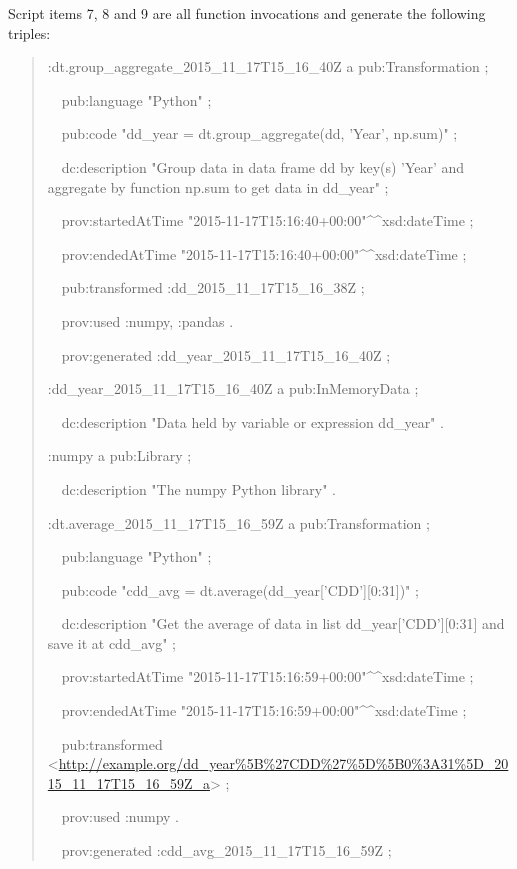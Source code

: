 Script items 7, 8 and 9 are all function invocations and generate the following triples:
\begin{quotation}
	\noindent:dt.group\_aggregate\_2015\_11\_17T15\_16\_40Z a pub:Transformation ;
	
	\noindent\ \ pub:language "Python" ;
	
	\noindent\ \ pub:code "dd\_year = dt.group\_aggregate(dd, 'Year', np.sum)" ;
	
	\noindent\ \ dc:description "Group data in data frame dd by key(s) 'Year' and aggregate by function np.sum to get data in dd\_year" ;
	
	\noindent\ \ prov:startedAtTime "2015-11-17T15:16:40+00:00"\^{}\^{}xsd:dateTime ;
	
	\noindent\ \ prov:endedAtTime "2015-11-17T15:16:40+00:00"\^{}\^{}xsd:dateTime ;
	
	\noindent\ \ pub:transformed :dd\_2015\_11\_17T15\_16\_38Z ;
	
	\noindent\ \ prov:used :numpy, :pandas .
	
	\noindent\ \ prov:generated :dd\_year\_2015\_11\_17T15\_16\_40Z ;
	
	\noindent:dd\_year\_2015\_11\_17T15\_16\_40Z a pub:InMemoryData ;
	
	\noindent\ \ dc:description "Data held by variable or expression dd\_year" .
	
	\noindent:numpy a pub:Library ;
	
	\noindent\ \ dc:description "The numpy Python library" .
	
	\noindent:dt.average\_2015\_11\_17T15\_16\_59Z a pub:Transformation ;
	
	\noindent\ \ pub:language "Python" ;
	
	\noindent\ \ pub:code "cdd\_avg = dt.average(dd\_year['CDD'][0:31])" ;
	
	\noindent\ \ dc:description "Get the average of data in list dd\_year['CDD'][0:31] and save it at cdd\_avg" ;
	
	\noindent\ \ prov:startedAtTime "2015-11-17T15:16:59+00:00"\^{}\^{}xsd:dateTime ;
	
	\noindent\ \ prov:endedAtTime "2015-11-17T15:16:59+00:00"\^{}\^{}xsd:dateTime ;
	
	\noindent\ \ pub:transformed <\url{http://example.org/dd_year%5B%27CDD%27%5D%5B0%3A31%5D_2015_11_17T15_16_59Z_a}> ;
		
	\noindent\ \ prov:used :numpy .
	
	\noindent\ \ prov:generated :cdd\_avg\_2015\_11\_17T15\_16\_59Z ;
	

\end{quotation}
